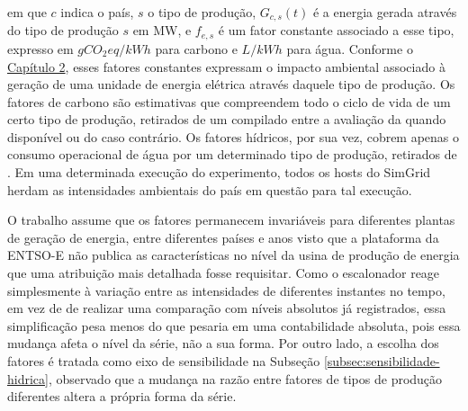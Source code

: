 em que $c$ indica o país, $s$ o tipo de produção, $G_{c,s}(t)$ é a energia gerada através do tipo de produção $s$ em MW, e $f_{e,s}$ 
é um fator constante associado a esse tipo, expresso em $gCO_{2}eq/kWh$ para carbono e $L/kWh$ para
água. Conforme o \hyperref[sec:pegadas-em-computacao]{Capítulo 2}, esses fatores constantes expressam
o impacto ambiental associado à geração de uma unidade de energia elétrica através daquele tipo de produção.
Os fatores de carbono são estimativas que compreendem todo o ciclo de vida de um certo
tipo de produção, retirados de um compilado entre a avaliação da \textcite{unece-carbon} quando disponível ou do \textcite{carbon-ipcc-2014}
caso contrário. Os fatores hídricos, por sua vez, cobrem apenas o consumo operacional de água por um determinado tipo de produção,
retirados de \textcite{water-macknick-2012}. Em uma determinada execução do experimento, todos os hosts do SimGrid
herdam as intensidades ambientais do país em questão para tal execução.

 O trabalho assume que os fatores permanecem invariáveis para diferentes plantas de 
geração de energia, entre diferentes países e anos visto que a plataforma da ENTSO-E não publica as características
no nível da usina de produção de energia que uma atribuição mais detalhada fosse requisitar. Como o escalonador reage
simplesmente à variação entre as intensidades de diferentes instantes no tempo, em vez de de realizar uma comparação com níveis
absolutos já registrados, essa simplificação pesa menos do que pesaria em uma contabilidade absoluta, pois essa mudança afeta
o nível da série, não a sua forma. Por outro lado, a escolha dos fatores é tratada como eixo de sensibilidade na Subseção
\ref{subsec:sensibilidade-hidrica}, observado que a mudança na razão entre fatores de tipos de produção diferentes
altera a própria forma da série.

